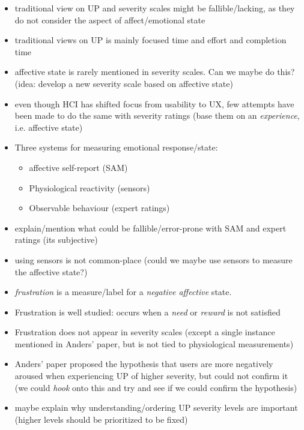 \begin{itemize}
    \item traditional view on UP and severity scales might be fallible/lacking,
        as they do not consider the aspect of affect/emotional state
    \item traditional views on UP is mainly focused time and effort and completion
        time
    \item affective state is rarely mentioned in severity scales. Can we maybe
        do this? (idea: develop a new severity scale based on affective state)
    \item even though HCI has shifted focus from usability to UX, few attempts have
        been made to do the same with severity ratings (base them on an
        \textit{experience}, i.e. affective state)
    \item Three systems for measuring emotional response/state:
        \begin{itemize}
            \item affective self-report (SAM)
            \item Physiological reactivity (sensors)
            \item Observable behaviour (expert ratings)
        \end{itemize}
    \item explain/mention what could be fallible/error-prone with SAM and expert
        ratings (its subjective)
    \item using sensors is not common-place (could we maybe use sensors to
        measure the affective state?)
    \item \textit{frustration} is a measure/label for a \textit{negative
        affective} state.
    \item Frustration is well studied: occurs when a \textit{need} or
        \textit{reward} is not satisfied
    \item Frustration does not appear in severity scales (except a single instance mentioned in Anders' paper, but is not tied to physiological measurements)
    \item Anders' paper proposed the hypothesis that users are more negatively
        aroused when experiencing UP of higher severity, but could not confirm
        it (we could \textit{hook}
        onto this and try and see if we could confirm the hypothesis)
    \item maybe explain why understanding/ordering UP severity levels are important
        (higher levels should be prioritized to be fixed)

\end{itemize}
